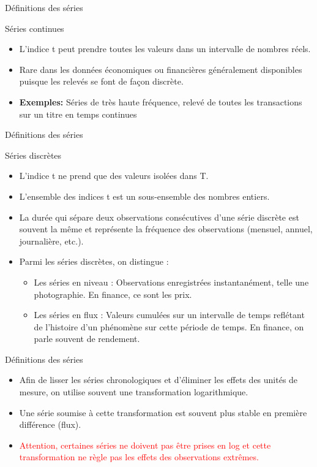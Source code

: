 \documentclass{beamer}
\begin{document}
\begin{frame}{Définitions des séries}
\begin{block}{Séries continues}
\begin{itemize}
\item L’indice t peut prendre toutes les valeurs dans un intervalle de nombres réels. 
\item Rare dans les données économiques ou financières généralement disponibles puisque les relevés se font de façon discrète. 
\item \textbf{Exemples:} Séries de très haute fréquence, relevé de toutes les transactions sur un titre en temps continues
\end{itemize}
\end{block}
\end{frame}


\begin{frame}{Définitions des séries}
\begin{block}{Séries discrètes}
\begin{itemize}
\item L’indice t ne prend que des valeurs isolées dans T. 
\item L’ensemble des indices t est un sous-ensemble des nombres entiers. 
\item La durée qui sépare deux observations consécutives d’une série discrète est souvent la même et représente la fréquence des observations (mensuel, annuel, journalière, etc.).
\item Parmi les séries discrètes, on distingue :
\begin{itemize}
\item Les séries en niveau : Observations enregistrées instantanément, telle une photographie. En finance, ce sont les prix.
\item Les séries en flux : Valeurs cumulées sur un intervalle de temps reflétant de l’histoire d’un phénomène sur cette période de temps. En finance, on parle souvent de rendement.
\end{itemize}
\end{itemize}
\end{block}
\end{frame}

\begin{frame}{Définitions des séries}
\begin{itemize}
\item Afin de lisser les séries chronologiques et d’éliminer les effets des unités de mesure, on utilise souvent une transformation logarithmique. 
\item Une série soumise à cette transformation est souvent plus stable en première différence (flux). 
\item \textcolor{red}{Attention, certaines séries ne doivent pas être prises en log et cette transformation ne règle pas les effets des observations extrêmes.} 
\end{itemize}
\end{frame}
\end{document}
